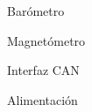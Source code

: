 
\begin{frame}{Barómetro}

\end{frame}

\begin{frame}{Magnetómetro}

\end{frame}

\begin{frame}{Interfaz CAN}

\end{frame}

\begin{frame}{Alimentación} %

\end{frame}

